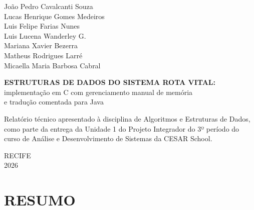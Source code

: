 \documentclass[12pt,a4paper,oneside]{report}
\begin{document}
\begin{center}\thispagestyle{empty}
\begin{center}
\onehalfspacing
João Pedro Cavalcanti Souza\\
Lucas Henrique Gomes Medeiros\\
Luis Felipe Farias Nunes\\
Luis Lucena Wanderley G.\\
Mariana Xavier Bezerra\\
Matheus Rodrigues Larré\\
Micaella Maria Barbosa Cabral

\vfill

\textbf{ESTRUTURAS DE DADOS DO SISTEMA ROTA VITAL:}\\
implementação em C com gerenciamento manual de memória\\
e tradução comentada para Java
\end{center}

\vspace{1.5cm}

\begin{flushright}
\begin{minipage}{0.55\textwidth}
\singlespacing
\small
Relatório técnico apresentado à disciplina de Algoritmos e Estruturas de Dados, como parte da entrega da Unidade 1 do Projeto Integrador do 3º período do curso de Análise e Desenvolvimento de Sistemas da CESAR School.
\end{minipage}
\end{flushright}

\vfill

\begin{center}
RECIFE\\
2026
\end{center}
\end{center}\newpage

\chapter*{RESUMO}
\thispagestyle{empty}
\end{document}
